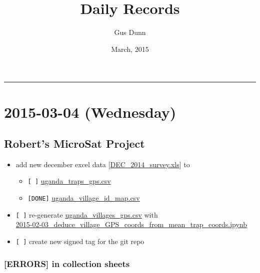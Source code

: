 \documentclass[letterpaper]{scrartcl}
\title{Daily Records\\\vspace{0.5em}{\large Caccone PostDoc}}
\author{Gus Dunn}
\date{March, 2015}
\begin{document}
\maketitle

{
\hypersetup{linkcolor=black}
\setcounter{tocdepth}{3}
\tableofcontents
}
\begin{center}\rule{0.5\linewidth}{\linethickness}\end{center}

\section{2015-03-04 (Wednesday)}\label{wednesday}

\subsection{Robert's MicroSat Project}\label{roberts-microsat-project}

\begin{itemize}
\itemsep1pt\parskip0pt
\item
  add new december excel data
  {[}\href{file:///home/gus/Dropbox/uganda_data/2014_Dec_new/DEC_2014_survey.xls}{DEC\_2014\_survey.xls}{]}
  to

  \begin{itemize}
  \itemsep1pt\parskip0pt
  \item
    \texttt{{[} {]}}
    \href{file:///home/gus/Dropbox/uganda_data/data_repos/field_data/locations/gps/traps/uganda_traps_gps.csv}{uganda\_traps\_gps.csv}
  \item
    \texttt{{[}DONE{]}}
    \href{file:///home/gus/Dropbox/uganda_data/data_repos/field_data/locations/names/uganda_village_id_map.csv}{uganda\_village\_id\_map.csv}
  \end{itemize}
\item
  \texttt{{[} {]}} re-generate
  \href{file:///home/gus/Dropbox/uganda_data/data_repos/field_data/locations/gps/villages/uganda_villages_gps.csv}{uganda\_villages\_gps.csv}
  with\\\href{file:///home/gus/Dropbox/repos/git/ipy_notebooks/YALE/maps_stuff/2015-02-03_deduce_village_GPS_coords_from_mean_trap_coords.ipynb}{2015-02-03\_deduce\_village\_GPS\_coords\_from\_mean\_trap\_coords.ipynb}
\item
  \texttt{{[} {]}} create new signed tag for the git repo
\end{itemize}

\subsubsection{\textbf{{[}ERRORS{]}} in collection
sheets}\label{errors-in-collection-sheets}
\end{document}
